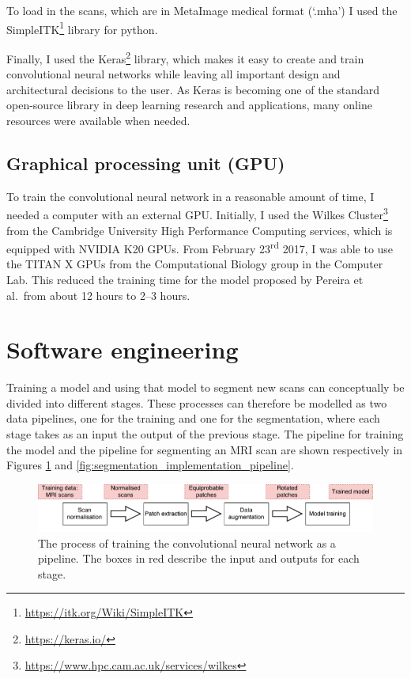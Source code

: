 \documentclass[12pt,a4paper,twoside,openright]{report}
\begin{document}
To load in the scans, which are in MetaImage medical format (`.mha') I used the SimpleITK\footnote{\url{https://itk.org/Wiki/SimpleITK}} library for python.

Finally, I used the Keras\footnote{\url{https://keras.io/}} library, which makes it easy to create and train convolutional neural networks while leaving all important design and architectural decisions to the user. As Keras is becoming one of the standard open-source library in deep learning research and applications, many online resources were available when needed.

\subsection{Graphical processing unit (GPU)}
To train the convolutional neural network in a reasonable amount of time, I needed a computer with an external GPU. Initially, I used the Wilkes Cluster\footnote{\url{https://www.hpc.cam.ac.uk/services/wilkes}} from the Cambridge University High Performance Computing services, which is equipped with NVIDIA K20 GPUs. From February 23\textsuperscript{rd} 2017, I was able to use the TITAN X GPUs from the Computational Biology group in the Computer Lab. This reduced the training time for the model proposed by Pereira et al.\ from about 12 hours to 2--3 hours.

\section{Software engineering}
Training a model and using that model to segment new scans can conceptually be divided into different stages. These processes can therefore be modelled as two data pipelines, one for the training and one for the segmentation, where each stage takes as an input the output of the previous stage. The pipeline for training the model and the pipeline for segmenting an MRI scan are shown respectively in Figures \ref{fig:training_implementation_pipeline} and \ref{fig:segmentation_implementation_pipeline}.

\begin{figure}
	\centering
	\includegraphics[width=\textwidth]{training_implementation_pipeline}
	\caption[The process of training the convolutional neural network as a pipeline.]{The process of training the convolutional neural network as a pipeline. The boxes in red describe the input and outputs for each stage.}
	\label{fig:training_implementation_pipeline}
\end{figure}
\end{document}
